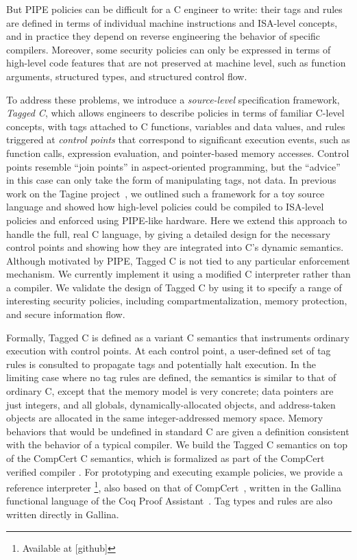\documentclass{llncs}
\begin{document}
But PIPE policies can be difficult for a C engineer to write: their tags and rules
are defined in terms of individual machine instructions and ISA-level
concepts, and in practice they depend on reverse engineering the behavior
of specific compilers. 
Moreover, some security policies can only be expressed in terms of high-level code
features that are not preserved at machine level, such as function
arguments, structured types, and structured control flow.

To address these problems, we introduce a \emph{source-level} specification framework, \emph{Tagged C},
which allows engineers to describe policies in terms of familiar C-level concepts, with tags attached
to C functions, variables and data values, and rules triggered at \emph{control points} that
correspond to significant execution events, such as function calls, expression evaluation,
and pointer-based memory accesses. 
Control points resemble ``join points'' in aspect-oriented programming, but the ``advice''
in this case can only take the form of manipulating tags, not data.
In previous work on the Tagine project~\cite{Chhak21:Tagine}, we outlined such a framework for a toy
source language and showed how high-level policies could be compiled to ISA-level policies and 
enforced using PIPE-like hardware.  Here we extend this approach to handle
the full, real C language, by giving a detailed design for the necessary control points and
showing how they are integrated into C's dynamic semantics. 
Although motivated by PIPE, Tagged C is not tied to any particular enforcement mechanism. 
We currently implement it using a modified C interpreter rather than a compiler.
We validate the design of Tagged C by using it to specify a range of interesting security policies,
including compartmentalization, memory protection, and secure information flow.


Formally, Tagged C is defined as a variant C semantics that instruments ordinary execution with
control points. At each control point, a user-defined set of tag rules is consulted to propagate
tags and potentially halt execution. In the limiting case where no tag rules are
defined, the semantics is similar to
that of ordinary C, except that the memory model is very concrete; 
data pointers are just integers, and all globals, dynamically-allocated objects,
and address-taken objects are allocated in the same integer-addressed memory space. Memory behaviors
that would be undefined in standard C are given a definition %
consistent with the behavior of a typical compiler.
We build the Tagged C semantics on top of the CompCert C semantics, which is formalized 
as part of the CompCert verified compiler \cite{Leroy09:CompCert,Leroy09:CompCertBackend}.
For prototyping and executing example policies,
we provide a reference interpreter \footnote{Available at [github]},
also based on that of CompCert~\cite[Ch. 4]{Leroy22:CompCertManual},
written in the Gallina functional language of the Coq Proof Assistant~\cite{coq}.
Tag types and rules are also written directly in Gallina. 
\end{document}
